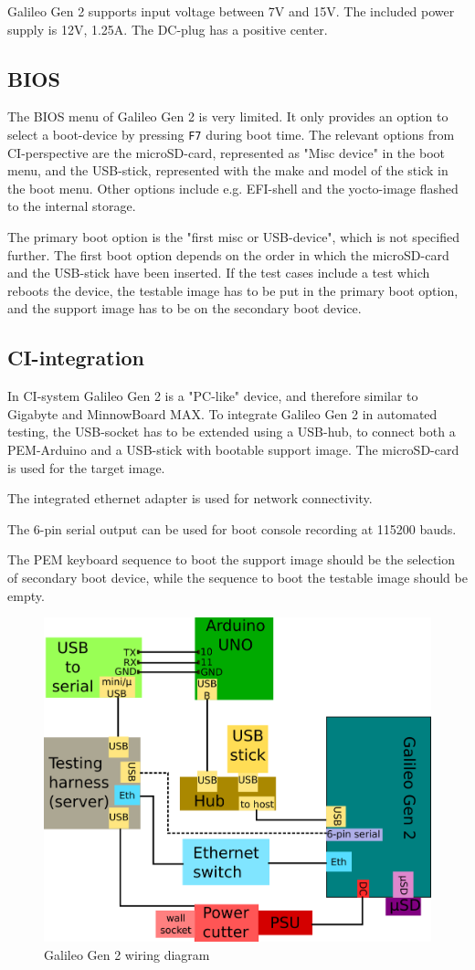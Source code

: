 \documentclass[a4paper,11pt]{article}
\newcommand{\cmd}[1]{\texttt{#1}}
\begin{document}
Galileo Gen 2 supports input voltage between 7V and 15V. The included power supply is 12V, 1.25A. The DC-plug has a positive center.

\subsection{BIOS}
The BIOS menu of Galileo Gen 2 is very limited. It only provides an option to select a boot-device by pressing \cmd{F7} during boot time. The relevant options from CI-perspective are the microSD-card, represented as "Misc device" in the boot menu, and the USB-stick, represented with the make and model of the stick in the boot menu. Other options include e.g. EFI-shell and the yocto-image flashed to the internal storage.

The primary boot option is the "first misc or USB-device", which is not specified further. The first boot option depends on the order in which the microSD-card and the USB-stick have been inserted. If the test cases include a test which reboots the device, the testable image has to be put in the primary boot option, and the support image has to be on the secondary boot device.

\subsection{CI-integration}

In CI-system Galileo Gen 2 is a "PC-like" device, and therefore similar to  Gigabyte and MinnowBoard MAX. To integrate Galileo Gen 2 in automated testing, the USB-socket has to be extended using a USB-hub, to connect both a PEM-Arduino and a USB-stick with bootable support image. The microSD-card is used for the target image.

The integrated ethernet adapter is used for network connectivity.

The 6-pin serial output can be used for boot console recording at 115200 bauds.

The PEM keyboard sequence to boot the support image should be the selection of secondary boot device, while the sequence to boot the testable image should be empty.

\begin{figure}[h]
	\centering
	\includegraphics[width=0.7\linewidth]{galileogen2wiring.png}
	\caption{Galileo Gen 2 wiring diagram}
	\label{fig:galileogen2wiring}
\end{figure}
\end{document}
